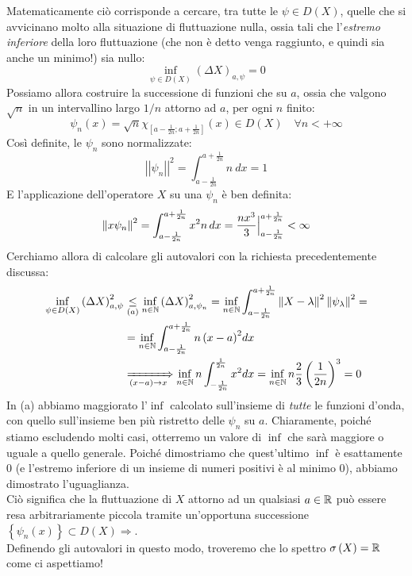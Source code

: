 \documentclass[../../FisicaTeorica.tex]{subfiles}
\begin{document}
Matematicamente ciò corrisponde a cercare, tra tutte le $\psi \in D(X)$, quelle che si avvicinano molto alla situazione di fluttuazione nulla, ossia tali che l'\textit{estremo inferiore} della loro fluttuazione (che non è detto venga raggiunto, e quindi sia anche un minimo!) sia nullo:
\[
\inf_{\psi\in D\left(X\right)}{\left(\Delta X\right)_{a,\psi}}=0
\]
Possiamo allora costruire la successione di funzioni che  su $a$, ossia che valgono $\sqrt{n}$ in un intervallino largo $1/n$ attorno ad $a$, per ogni $n$ finito:
\[
\psi_n\left(x\right)=\sqrt n \chi_{\left[a-\frac{1}{2n};a+\frac{1}{2n}\right]}\left(x\right)\in D\left(X\right) \quad \forall n < +\infty
\]
Così definite, le $\psi_n$ sono normalizzate:
\[
\left|\left|\psi_n\right|\right|^2= \int_{a-\frac{1}{2n}}^{a+\frac{1}{2n}}{n\ dx}=1
\]
E l'applicazione dell'operatore $X$ su una $\psi_n$ è ben definita:
\[
\left\lVert x\psi_n\right\rVert^2 = \int_{a-\frac{1}{2n}}^{a+\frac{1}{2n}} x^2 n\,dx = \frac{nx^3}{3}\Big |^{a+\frac{1}{2n}}_{a-\frac{1}{2n}} < \infty
\]
Cerchiamo allora di calcolare gli autovalori con la richiesta  precedentemente discussa:
\begin{align*}
\inf_{\psi\in D\left(X\right)}{\left(\Delta X\right)_{a,\psi}^2}&\underset{(a)}{\leq} \inf_{n\in \mathbb{N}}{\left(\Delta X\right)_{a,\psi_n}^2}=
\inf_{n\in\mathbb{N}}\int_{a-\frac{1}{2n}}^{a+\frac{1}{2n}} \left\lVert X-\lambda\right\rVert^2 \left\lVert\psi_\lambda\right\rVert^2 = \\
&= \inf_{n\in\mathbb{N}}{\int_{a-\frac{1}{2n}}^{a+\frac{1}{2n}}{{n\left(x-a\right)}^2dx}} \\
&\xRightarrow[(x-a)\to x]{} \inf_{n\in\mathbb{N}}{n\int_{-\frac{1}{2n}}^{\frac{1}{2n}}{x^2dx}=\inf_{n\in\mathbb{N}}{n\frac{2}{3}\left(\frac{1}{2n}\right)^3}}=0
\end{align*}
In (a) abbiamo maggiorato l'$\inf$ calcolato sull'insieme di \textit{tutte} le funzioni d'onda, con quello sull'insieme ben più ristretto delle $\psi_n$  su $a$. Chiaramente, poiché stiamo escludendo molti casi, otterremo un valore di $\inf$ che sarà maggiore o uguale a quello generale. Poiché dimostriamo che quest'ultimo $\inf$ è esattamente $0$ (e l'estremo inferiore di un insieme di numeri positivi è al minimo $0$), abbiamo dimostrato l'uguaglianza.\\
Ciò significa che la fluttuazione di $X$ attorno ad un qualsiasi $a\in \mathbb{R}$ può essere resa arbitrariamente piccola tramite un'opportuna successione $\left\{\psi_n(x)\right\}\subset D\left(X\right)\Rightarrow$.\\
Definendo gli autovalori in questo modo, troveremo che lo spettro $\sigma \left(X\right)=\mathbb{R}$ come ci aspettiamo!\\
\end{document}
